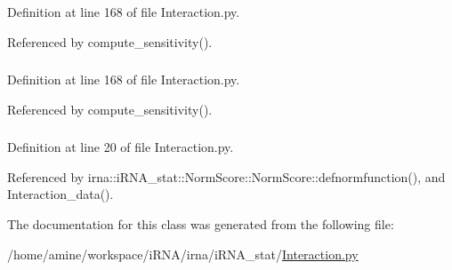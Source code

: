 \-Definition at line 168 of file \-Interaction.\-py.



\-Referenced by compute\-\_\-sensitivity().

\hypertarget{classirna_1_1iRNA__stat_1_1Interaction_1_1Interaction_a88b54f92134180d498ce915f367c1fa3}{
\subsubsection[{sensitivity}]{}}
\label{classirna_1_1iRNA__stat_1_1Interaction_1_1Interaction_a88b54f92134180d498ce915f367c1fa3}


\-Definition at line 168 of file \-Interaction.\-py.



\-Referenced by compute\-\_\-sensitivity().

\hypertarget{classirna_1_1iRNA__stat_1_1Interaction_1_1Interaction_a6869e0804e15e045070a215e2bf58f24}{
\subsubsection[{type\-\_\-sol}]{}}
\label{classirna_1_1iRNA__stat_1_1Interaction_1_1Interaction_a6869e0804e15e045070a215e2bf58f24}


\-Definition at line 20 of file \-Interaction.\-py.



\-Referenced by irna\-::i\-R\-N\-A\-\_\-stat\-::\-Norm\-Score\-::\-Norm\-Score\-::defnormfunction(), and \-Interaction\-\_\-data().



\-The documentation for this class was generated from the following file\-:\begin{DoxyCompactItemize}
\item 
/home/amine/workspace/i\-R\-N\-A/irna/i\-R\-N\-A\-\_\-stat/\hyperlink{iRNA__stat_2Interaction_8py}{\-Interaction.\-py}\end{DoxyCompactItemize}

